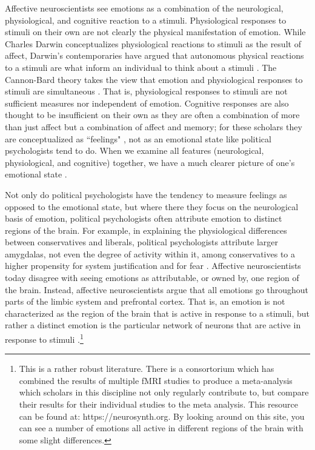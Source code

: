\documentclass[12pt]{article}
\begin{document}
Affective neuroscientists see emotions as a combination of the neurological, physiological, and cognitive reaction to a stimuli. Physiological responses to stimuli on their own are not clearly the physical manifestation of emotion. While Charles Darwin \citep{darwin_et-al_1998} conceptualizes physiological reactions to stimuli as the result of affect, Darwin's contemporaries have argued that autonomous physical reactions to a stimuli are what inform an individual to think about a stimuli \citep{james_2013}. The Cannon-Bard theory takes the view that emotion and physiological responses to stimuli are simultaneous \citep{cannon_1927}. That is, physiological responses to stimuli are not sufficient measures nor independent of emotion. Cognitive responses are also thought to be insufficient on their own as they are often a combination of more than just affect but a combination of affect and memory; for these scholars they are conceptualized as ``feelings" \citep{ralph_anderson_2018}, not as an emotional state like political psychologists tend to do. When we examine all features (neurological, physiological, and cognitive) together, we have a much clearer picture of one's emotional state \citep{ralph_anderson_2018}.

Not only do political psychologists have the tendency to measure feelings as opposed to the emotional state, but where there they focus on the neurological basis of emotion, political psychologists often attribute emotion to distinct regions of the brain. For example, in explaining the physiological differences between conservatives and liberals, political psychologists attribute larger amygdalas, not even the degree of activity within it, among conservatives to a higher propensity for system justification \citep{nam_et-al_2018} and for fear \citep{oxley_et-al_2008}. Affective neuroscientists today disagree with seeing emotions as attributable, or owned by, one region of the brain. Instead, affective neuroscientists argue that all emotions go throughout parts of the limbic system and prefrontal cortex. That is, an emotion is not characterized as the region of the brain that is active in response to a stimuli, but rather a distinct emotion is the particular network of neurons that are active in response to stimuli \citep{chang_et-al_2015}.\footnote{This is a rather robust literature. There is a consortorium which has combined the results of multiple fMRI studies to produce a meta-analysis which scholars in this discipline not only regularly contribute to, but compare their results for their individual studies to the meta analysis. This resource can be found at: https://neurosynth.org. By looking around on this site, you can see a number of emotions all active in different regions of the brain with some slight differences.}
\end{document}
